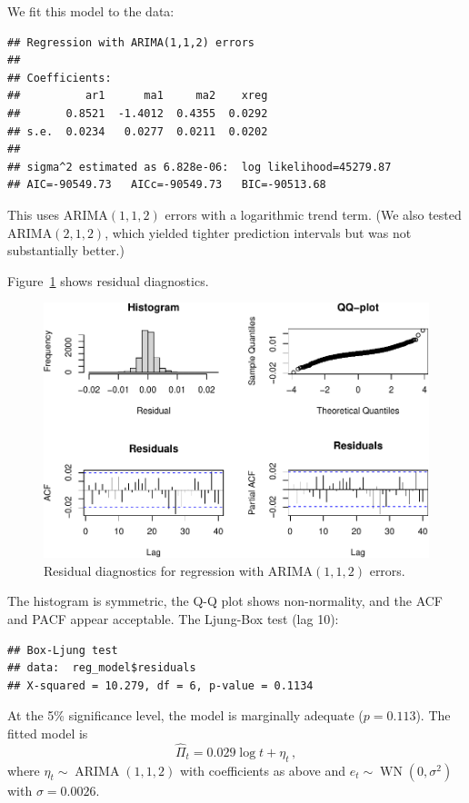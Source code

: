 \documentclass[final,11pt]{article}
\newcommand{\arima}{\operatorname{ARIMA}}
\theoremstyle{plain}
\theoremstyle{remark}
\begin{document}
We fit this model to the data:

\begin{verbatim}
## Regression with ARIMA(1,1,2) errors
##
## Coefficients:
##          ar1      ma1     ma2    xreg
##       0.8521  -1.4012  0.4355  0.0292
## s.e.  0.0234   0.0277  0.0211  0.0202
##
## sigma^2 estimated as 6.828e-06:  log likelihood=45279.87
## AIC=-90549.73   AICc=-90549.73   BIC=-90513.68
\end{verbatim}

This uses ARIMA$(1,1,2)$ errors with a logarithmic trend term. (We also
tested ARIMA$(2,1,2)$, which yielded tighter prediction intervals but was
not substantially better.)

Figure~\ref{fig:res} shows residual diagnostics.

\begin{figure}
\includegraphics{paper_files/figure-latex/unnamed-chunk-18-1.pdf}
\caption{Residual diagnostics for regression with ARIMA$(1,1,2)$ errors.}
\label{fig:res}
\end{figure}

The histogram is symmetric, the Q-Q plot shows non-normality, and the ACF
and PACF appear acceptable. The Ljung-Box test (lag 10):

\begin{verbatim}
## Box-Ljung test
## data:  reg_model$residuals
## X-squared = 10.279, df = 6, p-value = 0.1134
\end{verbatim}

At the 5\% significance level, the model is marginally adequate
($p = 0.113$). The fitted model is
\begin{equation}
  \hat{\Pi}_t = 0.029 \log t + \eta_t\,,
\end{equation}
where $\eta_t \sim \arima(1,1,2)$ with coefficients as above and
$e_t \sim \operatorname{WN}(0, \sigma^2)$ with $\sigma = 0.0026$.
\end{document}
